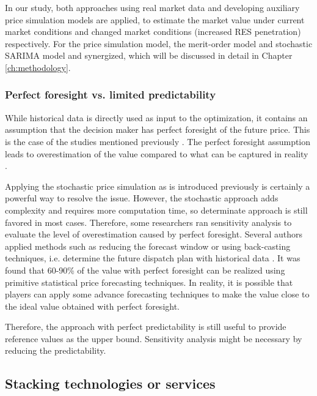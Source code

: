 In our study, both approaches using real market data and developing auxiliary price simulation models are applied, to estimate the market value under current market conditions and changed market conditions (increased RES penetration) respectively. For the price simulation model, the merit-order model and stochastic SARIMA model and synergized, which will be discussed in detail in Chapter \ref{ch:methodology}.

\subsubsection{Perfect foresight vs. limited predictability}
\label{sec:perfect-forecast}
While historical data is directly used as input to the optimization, it contains an assumption that the decision maker has perfect foresight of the future price. This is the case of the studies mentioned previously \cite{Walawalkar2007,Sioshansi2009,Byrne2012,Bradbury2014,McConnell2015,Berrada2016,Salles2017}. The perfect foresight assumption leads to overestimation of the value compared to what can be captured in reality \cite{Zucker2013}.

Applying the stochastic price simulation as is introduced previously is certainly a powerful way to resolve the issue. However, the stochastic approach adds complexity and requires more computation time, so determinate approach is still favored in most cases. Therefore, some researchers ran sensitivity analysis to evaluate the level of overestimation caused by perfect foresight. Several authors applied methods such as reducing the forecast window \cite{Connolly2011} or using back-casting techniques, i.e. determine the future dispatch plan with historical data \cite{Sioshansi2009,Drury2011,Bathurst2003}. It was found that 60-90\% of the value with perfect foresight can be realized using primitive statistical price forecasting techniques. In reality, it is possible that players can apply some advance forecasting techniques to make the value close to the ideal value obtained with perfect foresight. 

Therefore, the approach with perfect predictability is still useful to provide reference values as the upper bound. Sensitivity analysis might be necessary by reducing the predictability.

\subsection{Stacking technologies or services}

